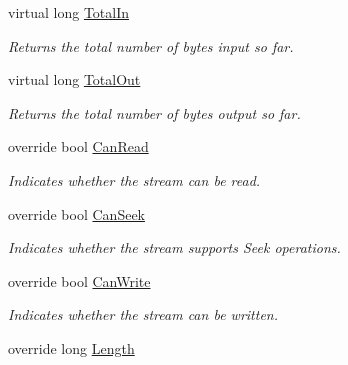 \begin{DoxyCompactItemize}
virtual long \mbox{\hyperlink{class_super_tiled2_unity_1_1_ionic_1_1_zlib_1_1_g_zip_stream_a4ffb8953936fc146795e0b76784369ac}{Total\+In}}
\begin{DoxyCompactList}\small\item\em Returns the total number of bytes input so far.\end{DoxyCompactList}\item 
virtual long \mbox{\hyperlink{class_super_tiled2_unity_1_1_ionic_1_1_zlib_1_1_g_zip_stream_aecc3867899f33926a632972aba76519f}{Total\+Out}}
\begin{DoxyCompactList}\small\item\em Returns the total number of bytes output so far.\end{DoxyCompactList}\item 
override bool \mbox{\hyperlink{class_super_tiled2_unity_1_1_ionic_1_1_zlib_1_1_g_zip_stream_a6340afe9b11c6b17cd965ca153d75f27}{Can\+Read}}
\begin{DoxyCompactList}\small\item\em Indicates whether the stream can be read. \end{DoxyCompactList}\item 
override bool \mbox{\hyperlink{class_super_tiled2_unity_1_1_ionic_1_1_zlib_1_1_g_zip_stream_a3a02ff35fb1b66b953a9cbda586871b8}{Can\+Seek}}
\begin{DoxyCompactList}\small\item\em Indicates whether the stream supports Seek operations. \end{DoxyCompactList}\item 
override bool \mbox{\hyperlink{class_super_tiled2_unity_1_1_ionic_1_1_zlib_1_1_g_zip_stream_a2e9b27e19327583b32fe086716245a40}{Can\+Write}}
\begin{DoxyCompactList}\small\item\em Indicates whether the stream can be written. \end{DoxyCompactList}\item 
override long \mbox{\hyperlink{class_super_tiled2_unity_1_1_ionic_1_1_zlib_1_1_g_zip_stream_ade637ab4f778c5ee7f5540e00662a645}{Length}}

\end{DoxyCompactItemize}
